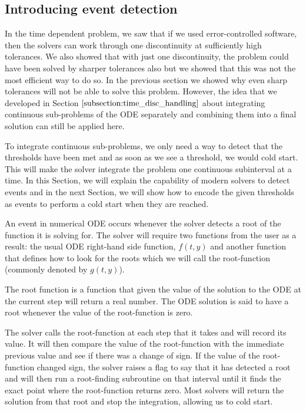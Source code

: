 \subsection{Introducing event detection}
\label{subsection:intro_event_detection}
In the time dependent problem, we saw that if we used error-controlled software, then the solvers can work through one discontinuity at sufficiently high tolerances. We also showed that with just one discontinuity, the problem could have been solved by sharper tolerances also but we showed that this was not the most efficient way to do so. In the previous section we showed why even sharp tolerances will not be able to solve this problem. However, the idea that we developed in Section $\ref{subsection:time_disc_handling}$ about integrating continuous sub-problems of the ODE separately and combining them into a final solution can still be applied here. 

To integrate continuous sub-problems, we only need a way to detect that the thresholds have been met and as soon as we see a threshold, we would cold start. This will make the solver integrate the problem one continuous subinterval at a time. In this Section, we will explain the capability of modern solvers to detect events and in the next Section, we will show how to encode the given thresholds as events to perform a cold start when they are reached.

An event in numerical ODE occurs whenever the solver detects a root of the function it is solving for. The solver will require two functions from the user as a result: the usual ODE right-hand side function, $f(t, y)$ and another function that defines how to look for the roots which we will call the root-function (commonly denoted by $g(t, y)$).

The root function is a function that given the value of the solution to the ODE at the current step will return a real number. The ODE solution is said to have a root whenever the value of the root-function is zero.

The solver calls the root-function at each step that it takes and will record its value. It will then compare the value of the root-function with the immediate previous value and see if there was a change of sign. If the value of the root-function changed sign, the solver raises a flag to say that it has detected a root and will then run a root-finding subroutine on that interval until it finds the exact point where the root-function returns zero. Most solvers will return the solution from that root and stop the integration, allowing us to cold start.

